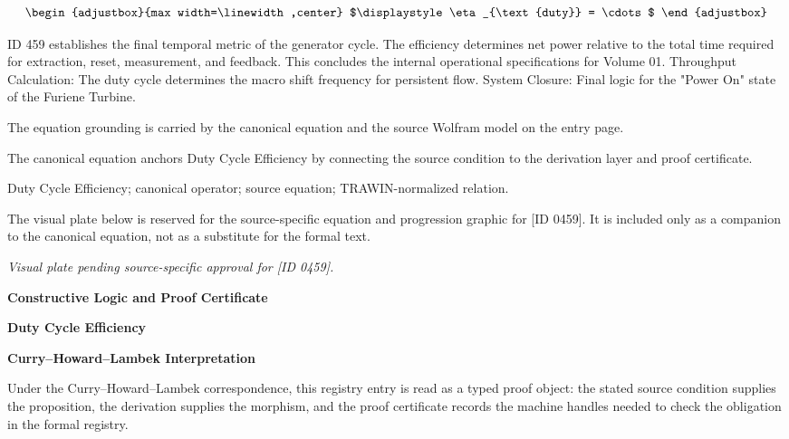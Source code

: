 \[
\begin{adjustbox}{max width=\linewidth,center}
$\displaystyle
\eta_{\text{duty}} = \cdots
$
\end{adjustbox}
\]

ID 459 establishes the final temporal metric of the generator cycle. The efficiency determines net power relative to the total time required for extraction, reset, measurement, and feedback. This concludes the internal operational specifications for Volume 01. Throughput Calculation: The duty cycle determines the macro shift frequency for persistent flow. System Closure: Final logic for the "Power On" state of the Furiene Turbine.

The equation grounding is carried by the canonical equation and the source Wolfram model on the entry page.

The canonical equation anchors Duty Cycle Efficiency by connecting the source condition to the derivation layer and proof certificate.

Duty Cycle Efficiency; canonical operator; source equation; TRAWIN-normalized relation.
\endgroup

\begingroup\footnotesize\sloppy
The visual plate below is reserved for the source-specific equation and progression graphic for [ID 0459]. It is included only as a companion to the canonical equation, not as a substitute for the formal text.
\par\endgroup
\begingroup\footnotesize\itshape
Visual plate pending source-specific approval for [ID 0459].
\par\endgroup

\clearpage
\begingroup\tzpsupportsetup
\noindent\textbf{\fontsize{10.8pt}{12.8pt}\selectfont [ID 0459] Constructive Logic and Proof Certificate}\par
\noindent\textbf{\fontsize{10pt}{12pt}\selectfont Duty Cycle Efficiency}\par
\vspace{0.45em}
\begingroup
\footnotesize
\setlength{\parskip}{0.22em}
\setlength{\parindent}{0pt}
\noindent\textbf{Curry--Howard--Lambek Interpretation}\par
Under the Curry--Howard--Lambek correspondence, this registry entry is read as a typed proof
object: the stated source condition supplies the proposition, the derivation supplies the
morphism, and the proof certificate records the machine handles needed to check the obligation
in the formal registry.

